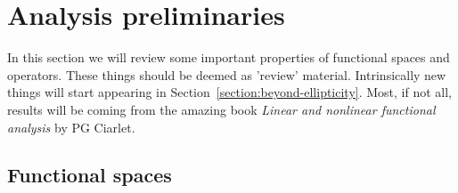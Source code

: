 \documentclass{article}
\begin{document}
\section{Analysis preliminaries}
In this section we will review some important properties of functional spaces and operators. These things should be deemed as 'review' material. Intrinsically new things will start appearing in Section~\ref{section:beyond-ellipticity}. Most, if not all, results will be coming from the amazing book \emph{Linear and nonlinear functional analysis} by PG Ciarlet.

\subsection{Functional spaces}
\end{document}
